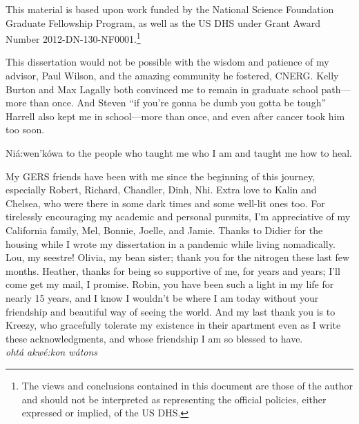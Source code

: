 \footnotesize{ 

This material is based upon work funded by the National Science Foundation Graduate
Fellowship Program, as well as the \gls{US} \gls{DHS} under Grant Award Number
2012-DN-130-NF0001.\footnote{The views and conclusions contained in this
document are those of the author and should not be interpreted as representing
the official policies, either expressed or implied, of the \gls{US} \gls{DHS}.} 

This dissertation would not be possible with the wisdom and patience of my
advisor, Paul Wilson, and the amazing community he fostered, CNERG. Kelly
Burton and Max Lagally both convinced me to remain in graduate school
path---more than once. And Steven ``if you're gonna be dumb you gotta be
tough'' Harrell also kept me in school---more than once, and even after cancer
took him too soon.  

Ni\'{a}:wen'k\'{o}wa to the people who taught me who I am and taught me how to
heal. 

My GERS friends have been with me since the beginning of this journey,
especially Robert, Richard, Chandler, Dinh, Nhi. Extra love to Kalin and
Chelsea, who were there in some dark times and some well-lit ones too.  For
tirelessly encouraging my academic and personal pursuits, I'm appreciative of
my California family, Mel, Bonnie, Joelle, and Jamie.  Thanks to Didier for the
housing while I wrote my dissertation in a pandemic while living nomadically.
Lou, my seestre!  Olivia, my bean sister; thank you for the nitrogen these last
few months.  Heather, thanks for being so supportive of me, for years and
years; I'll come get my mail, I promise.  Robin, you have been such a light in
my life for nearly 15 years, and I know I wouldn't be where I am today without
your friendship and beautiful way of seeing the world. And my last thank you is
to Kreezy, who gracefully tolerate my existence in their apartment even as I
write these acknowledgments, and whose friendship I am so blessed to have. \\

\noindent \emph{oht\'{a} akw\'{e}:kon w\'{a}tons}
}
